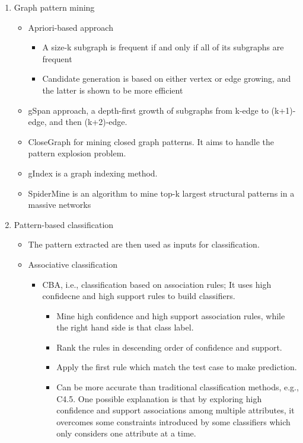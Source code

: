 \documentclass[12pt, a4paper]{article}
\begin{document}
\begin{enumerate}
  \item Graph pattern mining
   \begin{itemize}
    \item  Apriori-based approach
     \begin{itemize}
      \item A size-k subgraph is frequent if and only if all of its subgraphs are frequent
      \item Candidate generation is based on either vertex or edge growing, and the latter is shown to be more efficient
     \end{itemize}
     
     \item gSpan approach, a depth-first growth of subgraphs from k-edge to (k+1)-edge, and then (k+2)-edge.
    
    \item CloseGraph for mining closed graph patterns. It aims to handle the pattern explosion problem.
       
    \item gIndex is a graph indexing method.
    
    \item SpiderMine is an algorithm to mine top-k largest structural patterns in a massive networks
    
   \end{itemize}
   
   \item Pattern-based classification
    \begin{itemize}
     \item The pattern extracted are then used as inputs for classification.
     
     \item Associative classification
      \begin{itemize}
       \item CBA, i.e., classification based on association rules; It uses high confidecne and high support rules to build classifiers.
        \begin{itemize}
         \item Mine high confidence and high support association rules, while the right hand side is that class label. 
         \item Rank the rules in descending order of confidence and support.
         \item Apply the first rule which match the test case to make prediction.
         \item Can be more accurate than traditional classification methods, e.g., C4.5. One possible explanation is that by exploring high confidence and support associations among multiple attributes, it overcomes some constraints introduced by some classifiers which only considers one attribute at a time.
        \end{itemize}
        

\end{itemize}
\end{itemize}
\end{enumerate}
\end{document}
